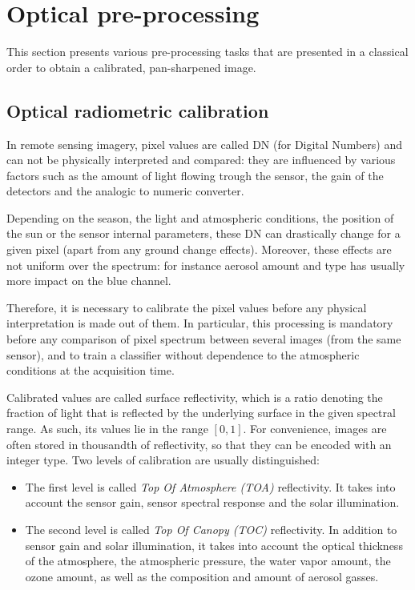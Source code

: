 \section{Optical pre-processing}\label{sec:optpreproc}

This section presents various pre-processing tasks that are presented in
a classical order to obtain a calibrated, pan-sharpened image.

\subsection{Optical radiometric calibration}\label{ssec:optcal}

In remote sensing imagery, pixel values are called DN (for Digital
Numbers) and can not be physically interpreted and compared: they are
influenced by various factors such as the amount of light flowing
trough the sensor, the gain of the detectors and the analogic to
numeric converter.

Depending on the season, the light and atmospheric conditions, the
position of the sun or the sensor internal parameters, these DN can
drastically change for a given pixel (apart from any ground change
effects). Moreover, these effects are not uniform over the spectrum:
for instance aerosol amount and type has usually more impact on the
blue channel.

Therefore, it is necessary to calibrate the pixel values before any
physical interpretation is made out of them. In particular, this
processing is mandatory before any comparison of pixel spectrum
between several images (from the same sensor), and to train a
classifier without dependence to the atmospheric conditions at the
acquisition time.

Calibrated values are called surface reflectivity, which is a ratio
denoting the fraction of light that is reflected by the underlying
surface in the given spectral range. As such, its values lie in the
range $[0,1]$. For convenience, images are often stored in thousandth
of reflectivity, so that they can be encoded with an integer type.
Two levels of calibration are usually distinguished:

\begin{itemize}
\item The first level is called \emph{Top Of Atmosphere (TOA)}
  reflectivity. It takes into account the sensor gain, sensor spectral
  response and the solar illumination.
\item The second level is called \emph{Top Of Canopy (TOC)}
  reflectivity. In addition to sensor gain and solar illumination, it
  takes into account the optical thickness of the atmosphere, the
  atmospheric pressure, the water vapor amount, the ozone amount, as
  well as the composition and amount of aerosol gasses.
\end{itemize}


